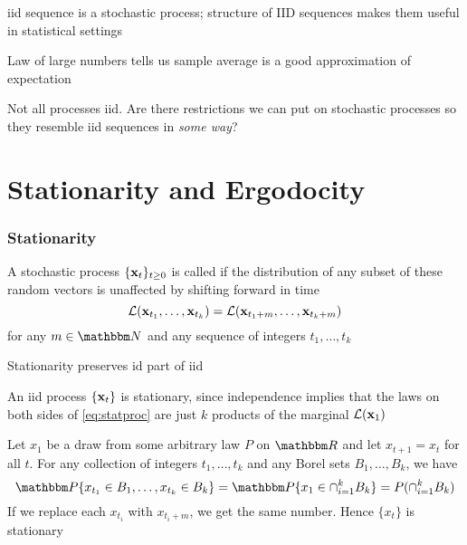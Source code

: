 \begin{frame}

    \vspace{2em}
    {\sc iid} sequence is a stochastic process; structure of $\text{IID}$ sequences makes 
    them useful in  statistical settings
    
    \vspace{1em}
    Law of large numbers tells us sample average is a good approximation of expectation
    
    \vspace{1em}
    Not all processes {\sc iid}. Are there restrictions we can put
    on stochastic processes
    so they resemble {\sc iid} sequences in \emph{some way}?

\end{frame}

\section{Stationarity and Ergodocity}

\begin{frame}\frametitle{Stationarity}

    \vspace{2em}
    A stochastic process $\{ {\mathbf x}_t \}_{t \geq 0}$ is called
     if  the distribution of any
    subset of these random vectors is unaffected by shifting  forward in time
    \begin{equation}
    \label{eq:statproc}
    \mathcal L ( {\mathbf x}_{t_1}, \ldots, {\mathbf x}_{t_k} )
    =
    \mathcal L ( {\mathbf x}_{t_1 + m}, \ldots, {\mathbf x}_{t_k + m} )
    \end{equation}
    for any $m \in \NN$ and any sequence of integers $t_1, \ldots, t_k$
    
    \vspace{1em}
    Stationarity preserves {\sc id} part of {\sc iid}
    
\end{frame}

\begin{frame}

    \vspace{2em}
    \Eg
    An {\sc iid} process $\{{\mathbf x}_t\}$ is stationary, since independence implies that the
    laws on both sides of \eqref{eq:statproc} are just $k$ products of the
    marginal $\mathcal L({\mathbf x}_1)$
    
    \vspace{1.5em}
    \Eg
    \label{eg:llnfail0}
    Let $x_1$ be a draw from some arbitrary law $P$ on $\RR$ 
    and let $x_{t+1} = x_t$ for all $t$.  For any collection of integers $t_1,
    \ldots, t_k$ and any Borel sets $B_1, \ldots, B_k$, we have
    \begin{equation*}
        \PP\{x_{t_1} \in B_1, \ldots, x_{t_k} \in B_k\}
        = \PP \{x_1 \in \cap_{i=1}^k B_k \}
        = P ( \cap_{i=1}^k B_k )
    \end{equation*}
    If we replace each $x_{t_i}$ with $x_{t_i + m}$, we get the same number.
    Hence $\{x_t\}$ is stationary
    
\end{frame}

